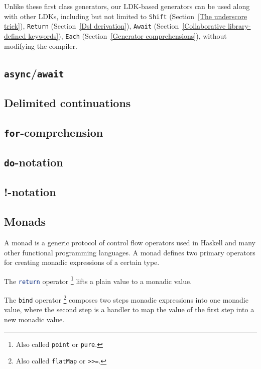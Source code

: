 Unlike these first class generators, our LDK-based generators can be used along with other LDKs, including but not limited to \lstinline{Shift} (Section~\ref{The underscore trick}), \lstinline{Return} (Section~\ref{Dsl derivation}), \lstinline{Await} (Section~\ref{Collaborative library-defined keywords}), \lstinline{Each} (Section~\ref{Generator comprehensions}), without modifying the compiler.

\subsection{\lstinline{async}/\lstinline{await}}

\subsection{Delimited continuations}

\subsection{\lstinline{for}-comprehension}\label{for-comprehension}

\subsection{\lstinline{do}-notation}\label{do-notation}


\subsection{!-notation}

\subsection{Monads}\label{Monads}

A monad is a generic protocol of control flow operators used in Haskell and many other functional programming languages. A monad defines two primary operators for creating monadic expressions of a certain type.
\begin{enumerate*}
  \item The \lstinline[language=Haskell,deletekeywords={return}]{return} operator \footnote{Also called \lstinline{point} or \lstinline{pure}.} lifts a plain value to a monadic value.
  \item The \lstinline{bind} operator \footnote{Also called \lstinline{flatMap} or \lstinline{>>=}.} composes two steps monadic expressions into one monadic value, where the second step is a handler to map the value of the first step into a new monadic value.
\end{enumerate*}

